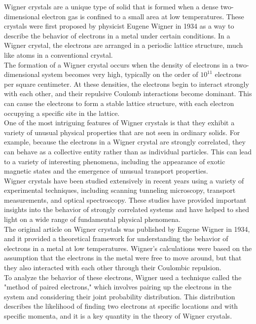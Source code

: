 Wigner crystals are a unique type of solid that is formed when a dense two-dimensional electron gas is confined to a small area at low temperatures. These crystals were first proposed by physicist Eugene Wigner in 1934 as a way to describe the behavior of electrons in a metal under certain conditions. In a Wigner crystal, the electrons are arranged in a periodic lattice structure, much like atoms in a conventional crystal.\\

The formation of a Wigner crystal occurs when the density of electrons in a two-dimensional system becomes very high, typically on the order of $10^{11}$ electrons per square centimeter. At these densities, the electrons begin to interact strongly with each other, and their repulsive Coulomb interactions become dominant. This can cause the electrons to form a stable lattice structure, with each electron occupying a specific site in the lattice.\\

One of the most intriguing features of Wigner crystals is that they exhibit a variety of unusual physical properties that are not seen in ordinary solids. For example, because the electrons in a Wigner crystal are strongly correlated, they can behave as a collective entity rather than as individual particles. This can lead to a variety of interesting phenomena, including the appearance of exotic magnetic states and the emergence of unusual transport properties.\\

Wigner crystals have been studied extensively in recent years using a variety of experimental techniques, including scanning tunneling microscopy, transport measurements, and optical spectroscopy. These studies have provided important insights into the behavior of strongly correlated systems and have helped to shed light on a wide range of fundamental physical phenomena.\\

The original article on Wigner crystals was published by Eugene Wigner in 1934, and it provided a theoretical framework for understanding the behavior of electrons in a metal at low temperatures. Wigner's calculations were based on the assumption that the electrons in the metal were free to move around, but that they also interacted with each other through their Coulombic repulsion.\\

To analyze the behavior of these electrons, Wigner used a technique called the "method of paired electrons," which involves pairing up the electrons in the system and considering their joint probability distribution. This distribution describes the likelihood of finding two electrons at specific locations and with specific momenta, and it is a key quantity in the theory of Wigner crystals.\\

